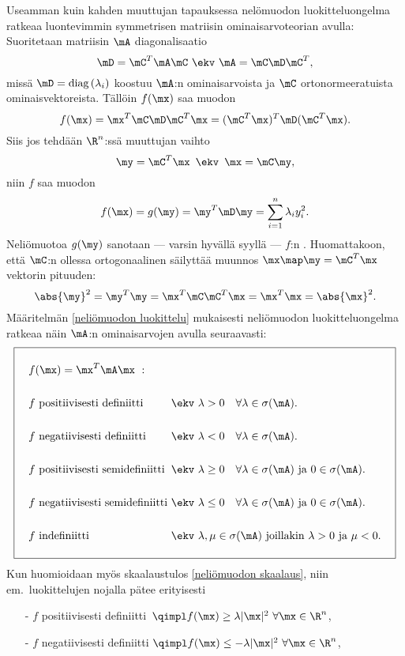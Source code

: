 Useamman kuin kahden muuttujan tapauksessa nelömuodon luokitteluongelma ratkeaa luontevimmin
symmetrisen matriisin ominaisarvoteorian avulla: Suoritetaan matriisin $\mA$ diagonalisaatio
\[
\mD=\mC^T\mA\mC \ \ekv \ \mA=\mC\mD\mC^T,
\]
missä $\mD=\text{diag}\,(\lambda_i)$ koostuu $\mA$:n ominaisarvoista ja $\mC$ 
ortonormeeratuista ominaisvektoreista. Tällöin $f(\mx)$ saa muodon
\[
f(\mx)=\mx^T\mC\mD\mC^T\mx=(\mC^T\mx)^T\mD(\mC^T\mx).
\]
Siis jos tehdään $\R^n$:ssä muuttujan vaihto
\[
\my=\mC^T\mx\,\ \ekv\,\ \mx=\mC\my,
\]
niin $f$ saa muodon
\[
f(\mx)=g(\my)=\my^T\mD\my=\sum_{i=1}^n\lambda_iy_i^2.
\]
Neliömuotoa $g(\my)$ sanotaan --- varsin hyvällä syyllä --- $f$:n 
. Huomattakoon, että $\mC$:n ollessa ortogonaalinen säilyttää
muunnos $\mx\map\my=\mC^T\mx$ vektorin pituuden:
\[
\abs{\my}^2=\my^T\my=\mx^T\mC\mC^T\mx=\mx^T\mx=\abs{\mx}^2.
\]
Määritelmän \ref{neliömuodon luokittelu} mukaisesti neliömuodon luokitteluongelma ratkeaa näin
$\mA$:n ominaisarvojen avulla seuraavasti:
\vspace{2mm}
\[
\boxed{
\begin{alignedat}{2}
\quad&f(\mx)=\mx^T\mA\mx \ : && \rule{0mm}{7mm} \\ \\
&f\text{ positiivisesti definiitti }&&\ekv \ \lambda>0\quad\forall \lambda\in\sigma(\mA). \\ \\
&f\text{ negatiivisesti definiitti } &&\ekv \ \lambda<0\quad\forall \lambda\in\sigma(\mA).\\ \\
&f\text{ positiivisesti semidefiniitti } &
  &\ekv \ \lambda\geq 0\quad\forall \lambda\in\sigma(\mA)\text{ ja } 0\in\sigma(\mA). \\ \\
&f\text{ negatiivisesti semidefiniitti } &
  &\ekv \ \lambda\leq 0\quad\forall \lambda\in\sigma(\mA)\text{ ja } 0\in\sigma(\mA). \\ \\
&f\text{ indefiniitti } &
  &\ekv \ \lambda,\mu\in\sigma(\mA)\text{ joillakin } \lambda>0\text{ ja }\mu<0. \quad
                                              \rule[-5mm]{0mm}{2mm}
\end{alignedat}}
\]
Kun huomioidaan myös skaalaustulos \eqref{neliömuodon skaalaus}, niin em.\ luokittelujen
nojalla pätee erityisesti
\begin{itemize}
\item[-] $f$ positiivisesti definiitti $\,\qimpl f(\mx) \ge \lambda|\mx|^2\ \forall \mx\in\R^n$,
\item[-] $f$ negatiivisesti definiitti $\qimpl f(\mx) \le -\lambda|\mx|^2\ \forall \mx\in\R^n$,
\end{itemize}
